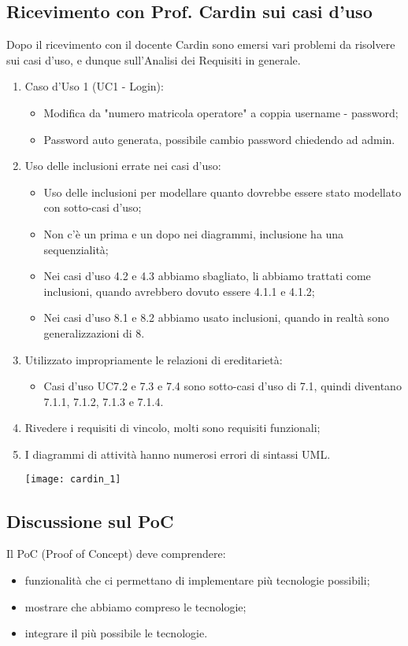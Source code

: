 	\subsection{Ricevimento con Prof. Cardin sui casi d'uso}
	Dopo il ricevimento con il docente Cardin sono emersi vari problemi da risolvere sui casi d'uso, e dunque sull'Analisi dei Requisiti in generale.
	\begin{enumerate}
		\item Caso d'Uso 1 (UC1 - Login):
			\begin{itemize}
				\item Modifica da "numero matricola operatore" a coppia username - password;
				\item Password auto generata, possibile cambio password chiedendo ad admin.
			\end{itemize}
		\item Uso delle inclusioni errate nei casi d'uso:
			\begin{itemize}
				\item Uso delle inclusioni per modellare quanto dovrebbe essere stato modellato con sotto-casi d'uso;
				\item Non c'è un prima e un dopo nei diagrammi, inclusione ha una sequenzialità;
				\item Nei casi d'uso 4.2 e 4.3 abbiamo sbagliato, li abbiamo trattati come inclusioni, quando avrebbero dovuto essere 4.1.1 e 4.1.2;
				\item Nei casi d'uso 8.1 e 8.2 abbiamo usato inclusioni, quando in realtà sono generalizzazioni di 8.
			\end{itemize}
		\item Utilizzato impropriamente le relazioni di ereditarietà:
			\begin{itemize}
				\item Casi d'uso UC7.2 e 7.3 e 7.4 sono sotto-casi d'uso di 7.1, quindi diventano 7.1.1, 7.1.2, 7.1.3 e 7.1.4.
			\end{itemize}
		\item Rivedere i requisiti di vincolo, molti sono requisiti funzionali;
		\pagebreak
		\item I diagrammi di attività hanno numerosi errori di sintassi UML.
		\begin{center}
			\texttt{[image: cardin\_1]}\\
		\end{center}
	\end{enumerate}
	\pagebreak
	\subsection{Discussione sul PoC}
	Il PoC (Proof of Concept) deve comprendere:
	\begin{itemize}
		\item funzionalità che ci permettano di implementare più tecnologie possibili;
		\item mostrare che abbiamo compreso le tecnologie;
		\item integrare il più possibile le tecnologie.
	\end{itemize}

